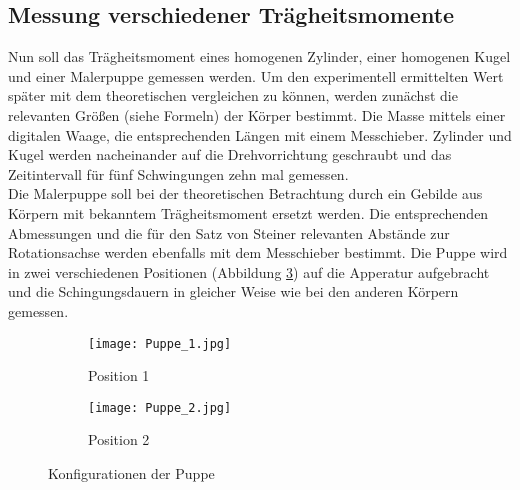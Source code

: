 \subsection{Messung verschiedener Trägheitsmomente}
Nun soll das Trägheitsmoment eines homogenen Zylinder, einer homogenen Kugel und einer
Malerpuppe gemessen werden. Um den experimentell ermittelten Wert später mit dem theoretischen
vergleichen zu können, werden zunächst die relevanten Größen (siehe Formeln) der Körper
bestimmt. Die Masse mittels einer digitalen Waage, die entsprechenden Längen mit einem
Messchieber. Zylinder und Kugel werden nacheinander auf die Drehvorrichtung geschraubt und
das Zeitintervall für fünf Schwingungen zehn mal gemessen. \\
Die Malerpuppe soll bei der theoretischen Betrachtung durch ein Gebilde aus Körpern mit
bekanntem Trägheitsmoment ersetzt werden. Die entsprechenden Abmessungen und die für den Satz
von Steiner relevanten Abstände zur Rotationsachse werden ebenfalls mit dem Messchieber bestimmt.
Die Puppe wird in zwei verschiedenen Positionen (Abbildung \ref{fig:konfig}) auf die Apperatur aufgebracht
und die Schingungsdauern in gleicher Weise wie bei den anderen Körpern gemessen. \\

\begin{figure}
\centering
\begin{subfigure}{0.48\textwidth}
\centering
\texttt{[image: Puppe\_1.jpg]}
\caption{Position 1}
\label{fig:pup1}
\end{subfigure}
\begin{subfigure}{0.48\textwidth}
\centering
\texttt{[image: Puppe\_2.jpg]}
\caption{Position 2}
\label{fig:pup2}
\end{subfigure}
\caption{Konfigurationen der Puppe}
\label{fig:konfig}
\end{figure}
